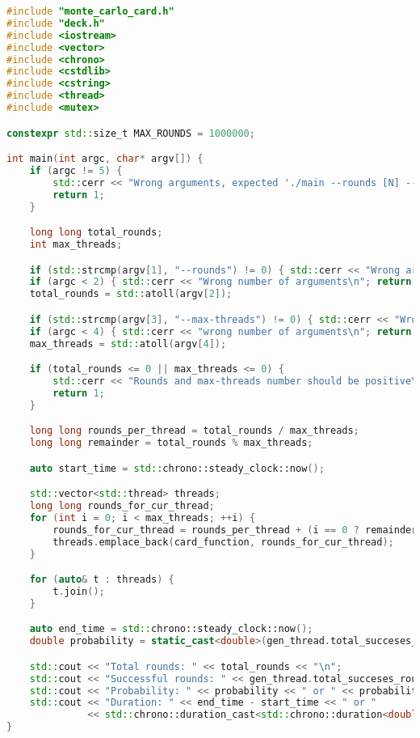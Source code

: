 \begin{lstlisting}[language=C++,caption=main.cpp,captionpos=b]
#include "monte_carlo_card.h"
#include "deck.h"
#include <iostream>
#include <vector>
#include <chrono>
#include <cstdlib>
#include <cstring>
#include <thread>
#include <mutex>

constexpr std::size_t MAX_ROUNDS = 1000000;

int main(int argc, char* argv[]) {
    if (argc != 5) {
        std::cerr << "Wrong arguments, expected './main --rounds [N] --max-threads [M]'\n";
        return 1;
    }

    long long total_rounds;
    int max_threads;

    if (std::strcmp(argv[1], "--rounds") != 0) { std::cerr << "Wrong arguments, expected '--rounds'\n"; return 1; }
    if (argc < 2) { std::cerr << "Wrong number of arguments\n"; return 1; }
    total_rounds = std::atoll(argv[2]);

    if (std::strcmp(argv[3], "--max-threads") != 0) { std::cerr << "Wrong arguments, expected '--max-threads'\n"; return 1; }
    if (argc < 4) { std::cerr << "wrong number of arguments\n"; return 1; }
    max_threads = std::atoll(argv[4]);

    if (total_rounds <= 0 || max_threads <= 0) {
        std::cerr << "Rounds and max-threads number should be positive\n";
        return 1;
    }

    long long rounds_per_thread = total_rounds / max_threads;
    long long remainder = total_rounds % max_threads;

    auto start_time = std::chrono::steady_clock::now();

    std::vector<std::thread> threads;
    long long rounds_for_cur_thread; 
    for (int i = 0; i < max_threads; ++i) {
        rounds_for_cur_thread = rounds_per_thread + (i == 0 ? remainder : 0);
        threads.emplace_back(card_function, rounds_for_cur_thread);
    }

    for (auto& t : threads) {
        t.join();
    }

    auto end_time = std::chrono::steady_clock::now();
    double probability = static_cast<double>(gen_thread.total_succeses_rounds) / gen_thread.total_rounds;

    std::cout << "Total rounds: " << total_rounds << "\n";
    std::cout << "Successful rounds: " << gen_thread.total_succeses_rounds << "\n";
    std::cout << "Probability: " << probability << " or " << probability * 100 << "%\n";
    std::cout << "Duration: " << end_time - start_time << " or " 
              << std::chrono::duration_cast<std::chrono::duration<double>>(end_time - start_time) << "\n";
}
\end{lstlisting}

